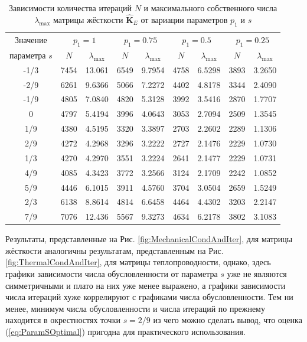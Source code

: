 \begin{table}[htbp]
    \centering
    \begin{threeparttable}%
        \caption{Зависимости количества итераций $N$ и максимального собственного числа $\lambda_{\max}$ матрицы жёсткости $\widehat{\textbf{K}}_E$ от вариации параметров $p_1$ и $s$}\label{tab:MechanicalIterAndMaxEgien}
        \begin{tabular}{|c|c|c|c|c|c|c|c|c|}
			\hline
			Значение & \multicolumn{2}{c|}{$p_1 = 1$} & \multicolumn{2}{c|}{$p_1 = 0.75$} & \multicolumn{2}{c|}{$p_1 = 0.5$} & \multicolumn{2}{c|}{$p_1 = 0.25$} \\ 
			\cline{2-9}
			параметра $s$ & $N$  & $\lambda_{\max}$ & $N$  & $\lambda_{\max}$ & $N$  & $\lambda_{\max}$ & $N$  & $\lambda_{\max}$ \\ 
			\hline
			-1/3 & 7454 & 13.061 & 6549 & 9.7954 & 4758 & 6.5298 & 3893 & 3.2650 \\
			\hline
			-2/9 & 6261 & 9.6366 & 5066 & 7.2272 & 4402 & 4.8178 & 3344 & 2.4090 \\
			\hline
			-1/9 & 4805 & 7.0840 & 4820 & 5.3128 & 3992 & 3.5416 & 2870 & 1.7707 \\
			\hline
			   0 & 4797 & 5.4194 & 3996 & 4.0643 & 3053 & 2.7094 & 2509 & 1.3545 \\
			\hline   
			 1/9 & 4380 & 4.5195 & 3320 & 3.3897 & 2703 & 2.2602 & 2289 & 1.1306 \\
			\hline 
			 2/9 & 4272 & 4.2968 & 3296 & 3.2222 & 2727 & 2.1476 & 2229 & 1.0730 \\
			\hline 
			 1/3 & 4270 & 4.2970 & 3551 & 3.2224 & 2641 & 2.1477 & 2229 & 1.0731 \\
			\hline 
			 4/9 & 4085 & 4.3423 & 3772 & 3.2566 & 3124 & 2.1709 & 2242 & 1.0852 \\
			\hline 
			 5/9 & 4446 & 6.1015 & 3911 & 4.5760 & 3704 & 3.0504 & 2659 & 1.5249 \\
			\hline 
			 2/3 & 6138 & 8.8614 & 4814 & 6.6458 & 4464 & 4.4302 & 3203 & 2.2147 \\
			\hline 
			 7/9 & 7076 & 12.436 & 5567 & 9.3273 & 4634 & 6.2178 & 3802 & 3.1083 \\
			\hline
        \end{tabular}
    \end{threeparttable}
\end{table}

Результаты, представленные на Рис. \ref{fig:MechanicalCondAndIter}, для матрицы жёсткости аналогичны результатам, представленным на Рис. \ref{fig:ThermalCondAndIter}, для матрицы теплопроводности, однако, здесь графики зависимости числа обусловленности от параметра $s$ уже не являются симметричными и плато на них уже менее выражено, а графики зависимости числа итераций хуже коррелируют с графиками числа обусловленности. Тем ни менее, минимум числа обусловленности и числа итераций по прежнему находится в окрестностях точки $s = 2/9$ из чего можно сделать вывод, что оценка (\ref{eq:ParamSOptimal}) пригодна для практического использования.

